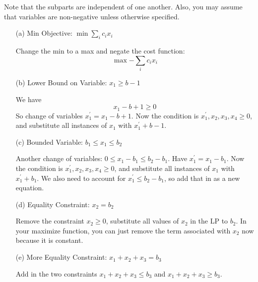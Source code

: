\documentclass{article}
\begin{document}
Note that the subparts are independent of one another. Also, you may assume that variables are non-negative unless otherwise specified. 
    \begin{itemize}
        \item [(a)] Min Objective: $\min{\sum_{i}c_{i} x_{i}}$
            \begin{answer}
                Change the min to a max and negate the cost function:
                    \begin{equation*}
                        \max{-\sum_{i}c_{i}x_{i}}
                    \end{equation*}
            \end{answer}

        \item [(b)] Lower Bound on Variable: $x_{1} \geq b-1$
            \begin{answer}
                We have
                    \begin{equation*}
                        x_{1} - b + 1 \geq 0
                    \end{equation*}
                So change of variables $x_{1}^{\prime} = x_{1} - b + 1$. Now the condition is $x_{1}^{\prime}, x_{2}, x_{3}, x_{4} \geq 0$, and substitute all instances of $x_{1}$ with $x_{1}^{\prime} + b - 1$.
            \end{answer}

        \item [(c)] Bounded Variable: $b_{1} \leq x_{1} \leq b_{2}$
            \begin{answer}
                Another change of variables: $0 \leq x_{1} - b_{1} \leq b_{2} - b_{1}$. Have $x^{\prime}_{1} = x_{1} - b_{1}$. Now the condition is $x_{1}^{\prime}, x_{2}, x_{3}, x_{4} \geq 0$, and substitute all instances of $x_{1}$ with $x_{1}^{\prime} + b_{1}$. We also need to account for $x_{1}^{\prime} \leq b_{2} - b_{1}$, so add that in as a new equation.
            \end{answer} 

        \item [(d)] Equality Constraint: $x_{2} = b_{2}$
            \begin{answer}
                Remove the constraint $x_{2} \geq 0$, substitute all values of $x_{2}$ in the LP to $b_{2}$. In your maximize function, you can just remove the term associated with $x_{2}$ now because it is constant.
            \end{answer}

        \item [(e)] More Equality Constraint: $x_{1} + x_{2} + x_{3} = b_{3}$
            \begin{answer}
                Add in the two constraints $x_{1} + x_{2} + x_{3} \leq b_{3}$ and $x_{1} + x_{2} + x_{3} \geq b_{3}$.
            \end{answer}


\end{itemize}
\end{document}
